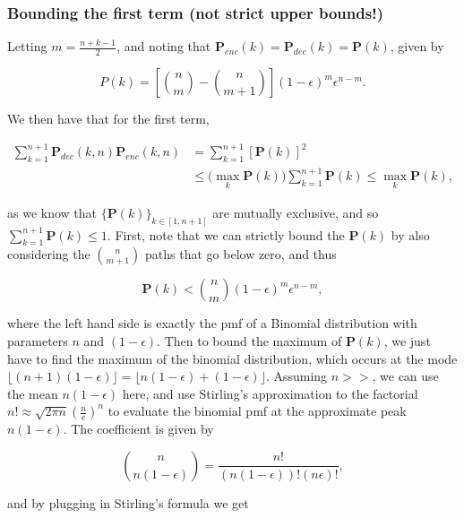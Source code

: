 \documentclass{article}
\newcommand{\eps}{\epsilon}
\begin{document}
\colorbox{gray!30}{
\begin{minipage}{\textwidth}
\subsubsection*{Bounding the first term (not strict upper bounds!)}

Letting $m = \frac{n+k-1}{2}$, and noting that $\mathbf{P}_{enc}(k) = \mathbf{P}_{dec}(k) = \mathbf{P}(k)$, given by 


$$P(k) = \left[ \binom{n}{m} - \binom{n}{m+1} \right] (1-\epsilon)^m \epsilon^{n-m}.$$

We then have that for the first term,

\begin{align*}
    \sum_{k=1}^{n+1} \mathbf{P}_{dec}(k, n) \mathbf{P}_{enc}(k, n) &= \sum_{k=1}^{n+1} [\mathbf{P}(k)]^2 \\
    &\leq \big(\max_k \mathbf{P}(k)\big) \sum_{k=1}^{n+1} \mathbf{P}(k) \leq \max_k \mathbf{P}(k),
\end{align*}

as we know that $\{\mathbf{P}(k)\}_{k \in [1,n+1]}$ are mutually exclusive, and so $\sum_{k=1}^{n+1} \mathbf{P}(k) \leq 1$. First, note that we can strictly bound the $\mathbf{P}(k)$ by also considering the $\binom{n}{m+1}$ paths that go below zero, and thus 

$$\mathbf{P}(k) < \binom{n}{m}  (1-\epsilon)^m \epsilon^{n-m},$$

where the left hand side is exactly the pmf of a Binomial distribution with parameters $n$ and $(1-\eps)$. Then to bound the maximum of $\mathbf{P}(k)$, we just have to find the maximum of the binomial distribution, which occurs at the mode $\lfloor (n+1) (1-\eps)\rfloor = \lfloor n(1-\eps) + (1-\eps)\rfloor$. Assuming $n>>$, we can use the mean $n(1-\eps)$ here, and use Stirling's approximation to the factorial $n! \approx \sqrt{2\pi n} \left(\frac{n}{e}\right)^n$ to evaluate the binomial pmf at the approximate peak $n(1-\eps)$. The coefficient is given by

$$
\binom{n}{n(1-\epsilon)} = \frac{n!}{(n(1-\epsilon))! (n\epsilon)!},
$$

and by plugging in Stirling's formula we get 


\end{minipage}}
\end{document}
